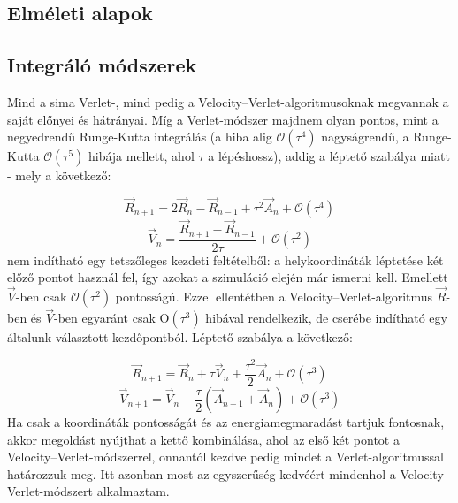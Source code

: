 \begin{multicols}{2}
\section{Elméleti alapok} \label{sec:3}
\subsection{Integráló módszerek} \label{sub:3.1}
Mind a sima Verlet-, mind pedig a Velocity--Verlet-algoritmusoknak megvannak a saját előnyei és hátrányai. Míg a Verlet-módszer majdnem olyan pontos, mint a negyedrendű Runge-Kutta integrálás (a hiba alig $\mathscr{O} \left( \tau^{4} \right)$ nagyságrendű, a Runge-Kutta $\mathscr{O} \left( \tau^{5} \right)$ hibája mellett, ahol $\tau$ a lépéshossz), addig a léptető szabálya miatt - mely a következő:

\begin{equation}
    \vec{R}_{n + 1}
    =
    2 \vec{R}_{n} - \vec{R}_{n - 1} + \tau^{2} \vec{A}_{n} + \mathscr{O} \left( \tau^{4} \right)
\end{equation}
\begin{equation}
    \vec{V}_{n}
    =
    \frac{\vec{R}_{n + 1} - \vec{R}_{n - 1}}{2 \tau} + \mathscr{O} \left( \tau^{2} \right)
\end{equation}
nem indítható egy tetszőleges kezdeti feltételből: a helykoordináták léptetése két előző pontot használ fel, így azokat a szimuláció elején már ismerni kell. Emellett $\vec{V}$-ben csak $\mathscr{O} \left( \tau^{2} \right)$ pontosságú. Ezzel ellentétben a Velocity--Verlet-algoritmus $\vec{R}$-ben és $\vec{V}$-ben egyaránt csak $\mathrm{O}\left( \tau^{3} \right)$ hibával rendelkezik, de cserébe indítható egy általunk választott kezdőpontból. Léptető szabálya a következő:

\begin{equation}
    \vec{R}_{n + 1}
    =
    \vec{R}_{n} + \tau \vec{V}_{n} + \frac{\tau^{2}}{2} \vec{A}_{n} + \mathscr{O} \left( \tau^{3} \right)
\end{equation}
\begin{equation}
    \vec{V}_{n + 1}
    =
    \vec{V}_{n} + \frac{\tau}{2} \left( \vec{A}_{n + 1} + \vec{A}_{n} \right) + \mathscr{O} \left( \tau^{3} \right)
\end{equation}
Ha csak a koordináták pontosságát és az energiamegmaradást tartjuk fontosnak, akkor megoldást nyújthat a kettő kombinálása, ahol az első két pontot a Velocity--Verlet-módszerrel, onnantól kezdve pedig mindet a Verlet-algoritmussal határozzuk meg. Itt azonban most az egyszerűség kedvéért mindenhol a Velocity--Verlet-módszert alkalmaztam.


\end{multicols}
